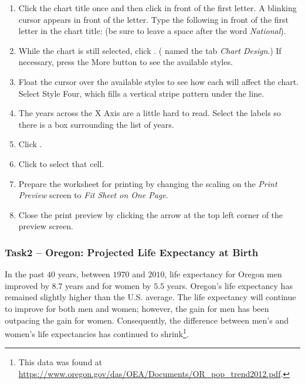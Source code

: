 \begin{enumerate}[resume]
	\item Click the chart title once and then click in front of the first letter. A blinking cursor appears in front of the letter. Type the following in front of the first letter in the chart title:  (be sure to leave a space after the word \textit{National}).
	\item While the chart is still selected, click . ( named the tab \textit{Chart Design}.) If necessary, press the More button to see the available styles.
	\item Float the cursor over the available styles to see how each will affect the chart. Select Style Four, which fills a vertical stripe pattern under the line.
	\item The years across the X Axis are a little hard to read. Select the labels so there is a box surrounding the list of years. 
	\item Click .
	\item Click  to select that cell.
	\item Prepare the  worksheet for printing by changing the scaling on the \textit{Print Preview} screen to \textit{Fit Sheet on One Page}.
	\item Close the print preview by clicking the arrow at the top left corner of the preview screen.
\end{enumerate}

\subsubsection{Task2 – Oregon: Projected Life Expectancy at Birth}

In the past $ 40 $ years, between $ 1970 $ and $ 2010 $, life expectancy for Oregon men improved by $ 8.7 $ years and for women by $ 5.5 $ years. Oregon's life expectancy has remained slightly higher than the U.S. average. The life expectancy will continue to improve for both men and women; however, the gain for men has been outpacing the gain for women. Consequently, the difference between men's and women's life expectancies has continued to shrink\footnote{This data was found at \url{https://www.oregon.gov/das/OEA/Documents/OR_pop_trend2012.pdf}.}.

